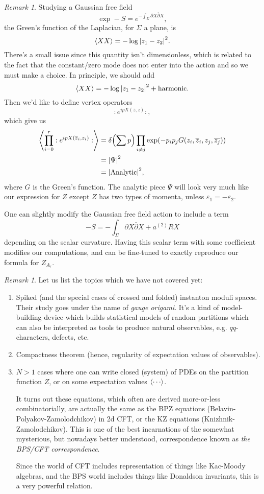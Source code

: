 \documentclass[leqno, openany]{memoir}
\theoremstyle{definition}
\theoremstyle{remark}
\newtheorem{rmk}[thm]{Remark}
\theoremstyle{plain}
\theoremstyle{definition}
\theoremstyle{remark}
\newcommand{\ep}{\varepsilon}
\newcommand{\mr}[1]{\mathrm{#1}}
\begin{document}
\begin{rmk}
Studying a Gaussian free field 
\[
\exp -S = e^{-\int_\Sigma \partial X \overline{\partial} X},
\]
the Green's function of the Laplacian, for $\Sigma$ a plane, is 
\[
\ev{XX} = - \log \abs{ z_1 - z_2 }^2.
\]
There's a small issue since this quantity isn't dimensionless, which is related to the fact that the constant/zero mode does not enter 
into the action and so we must make a choice. In principle, we should add 
\[
\ev{XX} = - \log \abs{ z_1 - z_2 }^2 + \text{harmonic}.
\]
Then we'd like to define vertex operators 
\[
:e^{i p X(\overline{z},z)}:,
\]
which give us 
\begin{align*}
    \ev{ \prod_{i = 0}^r : e^{i p X(\overline{z}_i,z_i)}: } &= \delta\qty(\sum p) \prod_{i \neq j} \exp(-p_i p_j G(z_i,\overline{z}_i, z_j,\overline{z_j})) \\
    &=\abs{ \Psi }^2 \\
    &= \abs{\mr{Analytic}}^2,
\end{align*}
where $G$ is the Green's function.
The analytic piece $\Psi$ will look very much like our expression for $Z$ except 
$Z$ has two types of momenta, unless $\ep_1 = -\ep_2$.

One can slightly modify the Gaussian free field action to include a term 
\[
-S = - \int_\Sigma \partial X \overline{\partial} X + a^{(2)} RX 
\]
depending on the scalar curvature. 
Having this scalar term with some coefficient modifies our computations, and can be fine-tuned to exactly reproduce our formula for $Z_{A_r}$.
\end{rmk}

\begin{rmk}
Let us list the topics which we have not covered yet:
\begin{enumerate}
\item Spiked (and the special cases of crossed and folded) instanton moduli spaces. Their study goes under the name of \emph{gauge origami}. It's a kind of model-building 
device which builds statistical models of random partitions which can also be interpreted as tools to produce natural 
observables, e.g. $qq$-characters, defects, etc. 
\item Compactness theorem (hence, regularity of expectation values of observables).
\item $N > 1$ cases where one can write closed (system) of PDEs on 
the partition function $Z$, or on some expectation values $\ev{\cdots}$. 

It turns out these equations, which often are derived more-or-less combinatorially,
are actually the same as the BPZ equations (Belavin-Polyakov-Zamolodchikov) in 2d CFT, 
or the KZ equations (Knizhnik-Zamolodchikov). This is one 
of the best incarnations of the somewhat mysterious, but 
nowadays better understood, correspondence known as \emph{the BPS/CFT correspondence}.

Since the world of CFT includes representation of things like 
Kac-Moody algebras, and the BPS world includes things like Donaldson invariants,
this is a very powerful relation. 
\end{enumerate}
\end{rmk}
\end{document}
